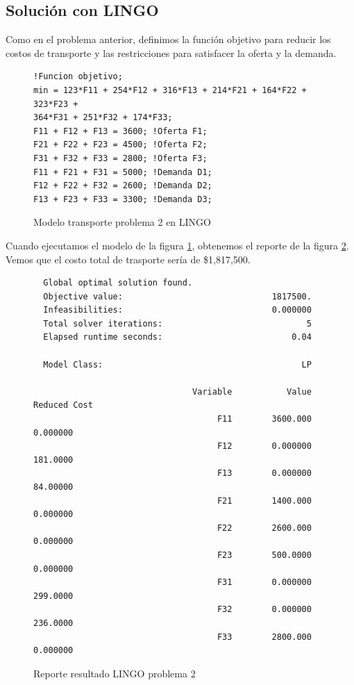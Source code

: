 \documentclass[12pt]{article}  %
\begin{document}
\subsection{Solución con LINGO}
Como en el problema anterior, definimos la función objetivo para reducir los costos de transporte y las restricciones para satisfacer la oferta y la demanda.

\begin{figure}[H]
	\centering
	\caption{Modelo transporte problema 2 en LINGO}
	\label{fig:lingoProb2}
	\begin{verbatim}
!Funcion objetivo;
min = 123*F11 + 254*F12 + 316*F13 + 214*F21 + 164*F22 + 323*F23 + 
364*F31 + 251*F32 + 174*F33;
F11 + F12 + F13 = 3600; !Oferta F1;
F21 + F22 + F23 = 4500; !Oferta F2;
F31 + F32 + F33 = 2800; !Oferta F3;
F11 + F21 + F31 = 5000; !Demanda D1;
F12 + F22 + F32 = 2600; !Demanda D2;
F13 + F23 + F33 = 3300; !Demanda D3;
	\end{verbatim}
\end{figure}

Cuando ejecutamos el modelo de la figura \ref{fig:lingoProb2}, obtenemos el reporte de la figura \ref{fig:reporteProb2}. Vemos que el costo total de trasporte sería de \$1,817,500.

\begin{figure}[H]
	\centering
	\caption{Reporte resultado LINGO problema 2}
	\label{fig:reporteProb2}
	\begin{verbatim}
  Global optimal solution found.
  Objective value:                              1817500.
  Infeasibilities:                              0.000000
  Total solver iterations:                             5
  Elapsed runtime seconds:                          0.04

  Model Class:                                        LP

                                Variable           Value        Reduced Cost
                                     F11        3600.000            0.000000
                                     F12        0.000000            181.0000
                                     F13        0.000000            84.00000
                                     F21        1400.000            0.000000
                                     F22        2600.000            0.000000
                                     F23        500.0000            0.000000
                                     F31        0.000000            299.0000
                                     F32        0.000000            236.0000
                                     F33        2800.000            0.000000
	\end{verbatim}
\end{figure}
\end{document}
